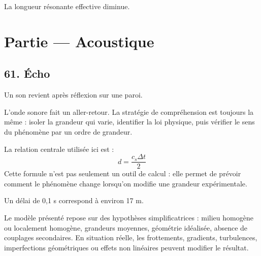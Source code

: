 \documentclass[11pt,a4paper]{article}
\begin{document}
\begin{corrigebox}[Indication]
La longueur résonante effective diminue.
\end{corrigebox}


\section{Partie — Acoustique}


\subsection{61. Écho}

\begin{exemplebox}
Un son revient après réflexion sur une paroi.
\end{exemplebox}

\begin{methodebox}
L'onde sonore fait un aller-retour.
La stratégie de compréhension est toujours la même : isoler la grandeur qui varie, identifier la loi physique, puis vérifier le sens du phénomène par un ordre de grandeur.
\end{methodebox}

\begin{theorembox}
La relation centrale utilisée ici est :
\[
d=\frac{c_s\Delta t}{2}
\]
Cette formule n'est pas seulement un outil de calcul : elle permet de prévoir comment le phénomène change lorsqu'on modifie une grandeur expérimentale.
\end{theorembox}

\begin{odgbox}
Un délai de 0,1 s correspond à environ 17 m.
\end{odgbox}

\begin{attentionbox}
Le modèle présenté repose sur des hypothèses simplificatrices : milieu homogène ou localement homogène, grandeurs moyennes, géométrie idéalisée, absence de couplages secondaires. En situation réelle, les frottements, gradients, turbulences, imperfections géométriques ou effets non linéaires peuvent modifier le résultat.
\end{attentionbox}
\end{document}

